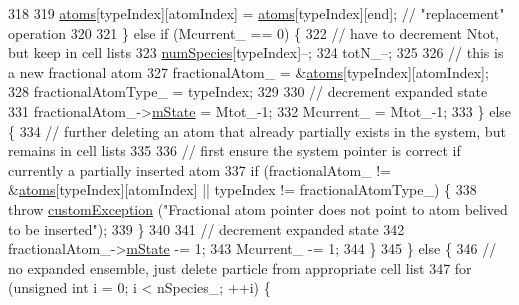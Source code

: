 \begin{DoxyCode}
318 
319                         \hyperlink{classsim_system_a90421b19082f7fb8fc23b7264b1161e4}{atoms}[typeIndex][atomIndex] = \hyperlink{classsim_system_a90421b19082f7fb8fc23b7264b1161e4}{atoms}[typeIndex][end];    \textcolor{comment}{// "replacement"
       operation}
320 
321                     \} \textcolor{keywordflow}{else} \textcolor{keywordflow}{if} (Mcurrent\_ == 0) \{
322                         \textcolor{comment}{// have to decrement Ntot, but keep in cell lists}
323                         \hyperlink{classsim_system_a9eea865e6dc1cff377b1e79c4d9c23f0}{numSpecies}[typeIndex]--;
324                         totN\_--;
325 
326                         \textcolor{comment}{// this is a new fractional atom}
327                         fractionalAtom\_ = &\hyperlink{classsim_system_a90421b19082f7fb8fc23b7264b1161e4}{atoms}[typeIndex][atomIndex];
328                         fractionalAtomType\_ = typeIndex;
329 
330                         \textcolor{comment}{// decrement expanded state}
331                         fractionalAtom\_->\hyperlink{classatom_a3cb00c0c5b7533657e05af6ff4a42740}{mState} = Mtot\_-1;
332                         Mcurrent\_ = Mtot\_-1;
333                     \} \textcolor{keywordflow}{else} \{
334                         \textcolor{comment}{// further deleting an atom that already partially exists in the system, but
       remains in cell lists}
335 
336                         \textcolor{comment}{// first ensure the system pointer is correct if currently a partially inserted
       atom}
337                         \textcolor{keywordflow}{if} (fractionalAtom\_ != &\hyperlink{classsim_system_a90421b19082f7fb8fc23b7264b1161e4}{atoms}[typeIndex][atomIndex] || typeIndex != 
      fractionalAtomType\_) \{
338                             \textcolor{keywordflow}{throw} \hyperlink{classcustom_exception}{customException} (\textcolor{stringliteral}{"Fractional atom pointer does not point
       to atom belived to be inserted"});
339                         \}
340 
341                         \textcolor{comment}{// decrement expanded state}
342                         fractionalAtom\_->\hyperlink{classatom_a3cb00c0c5b7533657e05af6ff4a42740}{mState} -= 1;
343                         Mcurrent\_ -= 1;
344                     \}
345                 \} \textcolor{keywordflow}{else} \{
346                     \textcolor{comment}{// no expanded ensemble, just delete particle from appropriate cell list}
347                     \textcolor{keywordflow}{for} (\textcolor{keywordtype}{unsigned} \textcolor{keywordtype}{int} i = 0; i < nSpecies\_; ++i) \{

\end{DoxyCode}
